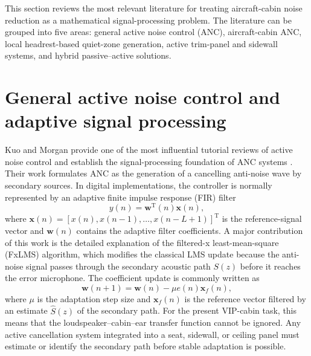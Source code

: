 This section reviews the most relevant literature for treating aircraft-cabin noise reduction as a mathematical signal-processing problem. The literature can be grouped into five areas: general active noise control (ANC), aircraft-cabin ANC, local headrest-based quiet-zone generation, active trim-panel and sidewall systems, and hybrid passive--active solutions.

\section{General active noise control and adaptive signal processing}
\label{sec:general-anc}

Kuo and Morgan provide one of the most influential tutorial reviews of active noise control and establish the signal-processing foundation of ANC systems \cite{kuo1999active}. Their work formulates ANC as the generation of a cancelling anti-noise wave by secondary sources. In digital implementations, the controller is normally represented by an adaptive finite impulse response (FIR) filter
\begin{equation}
    y(n) = \mathbf{w}^\mathrm{T}(n)\mathbf{x}(n),
    \label{eq:adaptive-filter-output}
\end{equation}
where $\mathbf{x}(n)=[x(n),x(n-1),\dots,x(n-L+1)]^\mathrm{T}$ is the reference-signal vector and $\mathbf{w}(n)$ contains the adaptive filter coefficients. A major contribution of this work is the detailed explanation of the filtered-x least-mean-square (FxLMS) algorithm, which modifies the classical LMS update because the anti-noise signal passes through the secondary acoustic path $S(z)$ before it reaches the error microphone. The coefficient update is commonly written as
\begin{equation}
    \mathbf{w}(n+1)=\mathbf{w}(n) - \mu e(n)\mathbf{x}_f(n),
    \label{eq:fxlms-update}
\end{equation}
where $\mu$ is the adaptation step size and $\mathbf{x}_f(n)$ is the reference vector filtered by an estimate $\hat{S}(z)$ of the secondary path. For the present VIP-cabin task, this means that the loudspeaker--cabin--ear transfer function cannot be ignored. Any active cancellation system integrated into a seat, sidewall, or ceiling panel must estimate or identify the secondary path before stable adaptation is possible.

